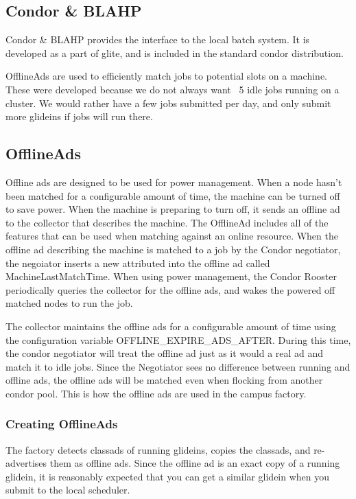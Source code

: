 \documentclass[11pt]{article}
\begin{document}
\subsection{Condor \& BLAHP}
\label{sec:condorandblahp}
Condor \& BLAHP provides the interface to the local batch system.  It is developed as a part of glite, and is included in the standard condor distribution. 

OfflineAds are used to efficiently match jobs to potential slots on a machine.  These were developed because we do not always want ~5 idle jobs running on a cluster.  We would rather have a few jobs submitted per day, and only submit more glideins if jobs will run there.


\subsection{OfflineAds}
Offline ads are designed to be used for power management. When a node hasn't been matched for a configurable amount of time, the machine can be turned off to save power. When the machine is preparing to turn off, it sends an offline ad to the collector that describes the machine. The OfflineAd includes all of the features that can be used when matching against an online resource.  When the offline ad describing the machine is matched to a job by the Condor negotiator, the negoiator inserts a new attributed into the offline ad called MachineLastMatchTime.  When using power management, the Condor Rooster periodically queries the collector for the offline ads, and wakes the powered off matched nodes to run the job.

The collector maintains the offline ads for a configurable amount of time using the configuration variable OFFLINE\_EXPIRE\_ADS\_AFTER. During this time, the condor negotiator will treat the offline ad just as it would a real ad and match it to idle jobs. Since the Negotiator sees no difference between running and offline ads, the offline ads will be matched even when flocking from another condor pool.  This is how the offline ads are used in the campus factory.

\subsubsection{Creating OfflineAds}
The factory detects classads of running glideins, copies the classads, and re-advertises them as offline ads. Since the offline ad is an exact copy of a running glidein, it is reasonably expected that you can get a similar glidein when you submit to the local scheduler.
\end{document}
